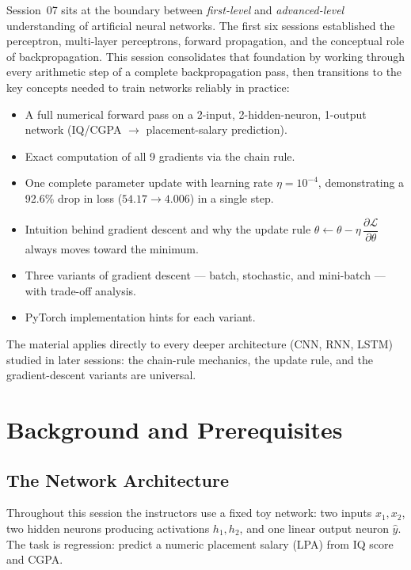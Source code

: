 \documentclass[12pt,a4paper]{article}
\newcommand{\Loss}{\mathcal{L}}
\newcommand{\yhat}{\hat{y}}
\newcommand{\pderiv}[2]{\dfrac{\partial #1}{\partial #2}}
\begin{document}
Session~07 sits at the boundary between \emph{first-level} and
\emph{advanced-level} understanding of artificial neural networks.
The first six sessions established the perceptron, multi-layer perceptrons,
forward propagation, and the conceptual role of backpropagation.
This session consolidates that foundation by working through every arithmetic
step of a complete backpropagation pass, then transitions to the key concepts
needed to train networks reliably in practice:

\begin{itemize}[leftmargin=2em]
  \item A full numerical forward pass on a 2-input, 2-hidden-neuron,
        1-output network (IQ/CGPA $\to$ placement-salary prediction).
  \item Exact computation of all 9 gradients via the chain rule.
  \item One complete parameter update with learning rate $\eta = 10^{-4}$,
        demonstrating a 92.6\% drop in loss ($54.17 \to 4.006$) in a single
        step.
  \item Intuition behind gradient descent and why the update rule
        $\theta \leftarrow \theta - \eta\,\pderiv{\Loss}{\theta}$ always
        moves toward the minimum.
  \item Three variants of gradient descent --- batch, stochastic, and
        mini-batch --- with trade-off analysis.
  \item PyTorch implementation hints for each variant.
\end{itemize}

The material applies directly to every deeper architecture (CNN, RNN, LSTM)
studied in later sessions: the chain-rule mechanics, the update rule, and the
gradient-descent variants are universal.

\section{Background and Prerequisites}
\label{sec:background}

\subsection{The Network Architecture}

Throughout this session the instructors use a fixed toy network:
two inputs $x_1, x_2$, two hidden neurons producing activations $h_1, h_2$,
and one linear output neuron $\yhat$.
The task is regression: predict a numeric placement salary (LPA) from
IQ score and CGPA.
\end{document}
